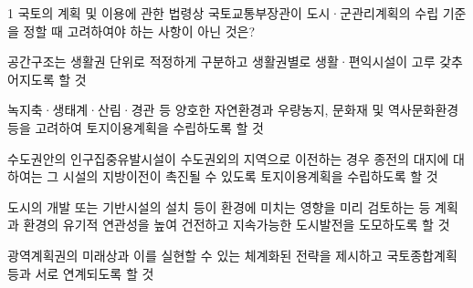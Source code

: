 \begin{question}{1}
국토의 계획 및 이용에 관한 법령상 국토교통부장관이 도시·군관리계획의 수립 기준을 정할 때 고려하여야 하는 사항이 아닌 것은?
\begin{choices}
  \item 공간구조는 생활권 단위로 적정하게 구분하고 생활권별로 생활·편익시설이 고루 갖추어지도록 할 것
  \item 녹지축·생태계·산림·경관 등 양호한 자연환경과 우량농지, 문화재 및 역사문화환경 등을 고려하여 토지이용계획을 수립하도록 할 것
  \item 수도권안의 인구집중유발시설이 수도권외의 지역으로 이전하는 경우 종전의 대지에 대하여는 그 시설의 지방이전이 촉진될 수 있도록 토지이용계획을 수립하도록 할 것
  \item 도시의 개발 또는 기반시설의 설치 등이 환경에 미치는 영향을 미리 검토하는 등 계획과 환경의 유기적 연관성을 높여 건전하고 지속가능한 도시발전을 도모하도록 할 것
  \item 광역계획권의 미래상과 이를 실현할 수 있는 체계화된 전략을 제시하고 국토종합계획 등과 서로 연계되도록 할 것
\end{choices}
\end{question}
